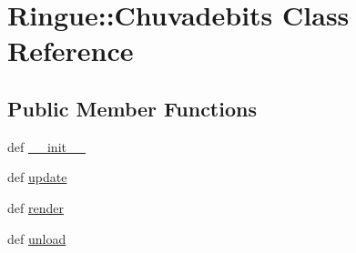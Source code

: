 \hypertarget{class_ringue_1_1_chuvadebits}{
\section{Ringue::Chuvadebits Class Reference}
\label{class_ringue_1_1_chuvadebits}
}
\subsection*{Public Member Functions}
\begin{CompactItemize}
\item 
def \hyperlink{class_ringue_1_1_chuvadebits_7e99a3eee40f22cd89b980afd6f255d8}{\_\-\_\-init\_\-\_\-}
\item 
def \hyperlink{class_ringue_1_1_chuvadebits_1eb0a985e76e763622f6160cf72dbf8e}{update}
\item 
def \hyperlink{class_ringue_1_1_chuvadebits_ff26f1acc928e339c1436b247d7a1a66}{render}
\item 
def \hyperlink{class_ringue_1_1_chuvadebits_f6a88cb5585f0f52c66dce41a664d495}{unload}
\end{CompactItemize}
